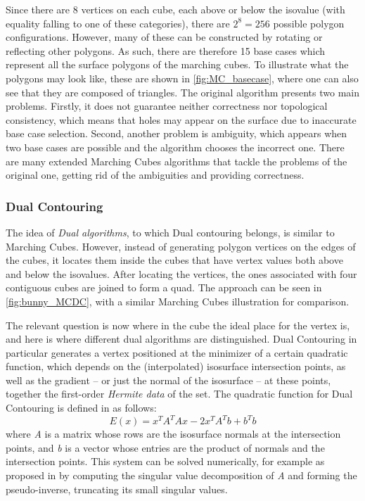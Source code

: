 Since there are 8 vertices on each cube, each above or below the isovalue (with equality falling to one of these categories), there are $2^8=256$ possible polygon configurations. However, many of these can be constructed by rotating or reflecting other polygons. As such, there are therefore 15 base cases which represent all the surface polygons of the marching cubes. To illustrate what the polygons may look like, these are shown in \autoref{fig:MC_basecase}, where one can also see that they are composed of triangles. 
The original algorithm presents two main problems. Firstly, it does not guarantee neither
correctness nor topological consistency, which means that holes may appear on the surface due
to inaccurate base case selection. Second, another problem is ambiguity, which appears when two
base cases are possible and the algorithm chooses the incorrect one. There are many extended Marching Cubes
algorithms that tackle the problems of the original one, getting rid of the ambiguities and
providing correctness. %

\subsubsection{Dual Contouring}
The idea of \emph{Dual algorithms}, to which Dual contouring belongs, is similar to Marching Cubes. However, instead of generating polygon vertices on the
edges of the cubes, it locates them inside the cubes that have vertex values both above and below the isovalues.
After locating the vertices, the ones associated with four contiguous cubes are joined to form a quad. The approach can be seen in \autoref{fig:bunny_MCDC}, with a similar Marching Cubes illustration for comparison. 

The relevant question is now where in the cube the ideal place for the vertex is, and here is where different dual algorithms are distinguished. Dual Contouring in particular generates a vertex positioned at the minimizer of a
certain quadratic function, which depends on the (interpolated) isosurface intersection points, as well as the gradient -- or just the normal of the isosurface -- at these points, together the first-order \emph{Hermite data} of the set.
The quadratic function for Dual Contouring is defined in \cite{Hermite2002} as follows:
\begin{equation*}
E(x)= x^TA^TAx-2x^TA^Tb+b^Tb
\end{equation*}
where \textit{A} is a matrix whose rows are the isosurface normals at the intersection points, and \textit{b} is a vector whose entries are the product of normals and the intersection points. This system can be solved numerically, for example as proposed in \cite{Hermite2002} by computing the
singular value decomposition of \textit{A} and forming the pseudo-inverse, truncating its small singular values. 


